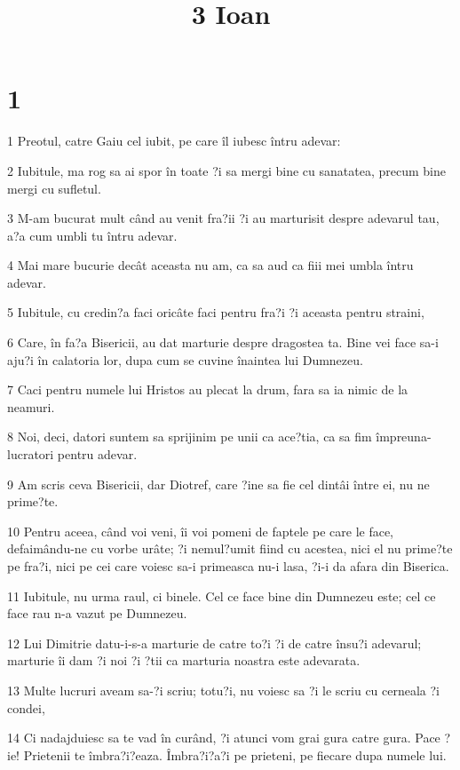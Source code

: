 

\title{3 Ioan}


\chapter{1}

\par 1 Preotul, catre Gaiu cel iubit, pe care îl iubesc întru adevar:
\par 2 Iubitule, ma rog sa ai spor în toate ?i sa mergi bine cu sanatatea, precum bine mergi cu sufletul.
\par 3 M-am bucurat mult când au venit fra?ii ?i au marturisit despre adevarul tau, a?a cum umbli tu întru adevar.
\par 4 Mai mare bucurie decât aceasta nu am, ca sa aud ca fiii mei umbla întru adevar.
\par 5 Iubitule, cu credin?a faci oricâte faci pentru fra?i ?i aceasta pentru straini,
\par 6 Care, în fa?a Bisericii, au dat marturie despre dragostea ta. Bine vei face sa-i aju?i în calatoria lor, dupa cum se cuvine înaintea lui Dumnezeu.
\par 7 Caci pentru numele lui Hristos au plecat la drum, fara sa ia nimic de la neamuri.
\par 8 Noi, deci, datori suntem sa sprijinim pe unii ca ace?tia, ca sa fim împreuna-lucratori pentru adevar.
\par 9 Am scris ceva Bisericii, dar Diotref, care ?ine sa fie cel dintâi între ei, nu ne prime?te.
\par 10 Pentru aceea, când voi veni, îi voi pomeni de faptele pe care le face, defaimându-ne cu vorbe urâte; ?i nemul?umit fiind cu acestea, nici el nu prime?te pe fra?i, nici pe cei care voiesc sa-i primeasca nu-i lasa, ?i-i da afara din Biserica.
\par 11 Iubitule, nu urma raul, ci binele. Cel ce face bine din Dumnezeu este; cel ce face rau n-a vazut pe Dumnezeu.
\par 12 Lui Dimitrie datu-i-s-a marturie de catre to?i ?i de catre însu?i adevarul; marturie îi dam ?i noi ?i ?tii ca marturia noastra este adevarata.
\par 13 Multe lucruri aveam sa-?i scriu; totu?i, nu voiesc sa ?i le scriu cu cerneala ?i condei,
\par 14 Ci nadajduiesc sa te vad în curând, ?i atunci vom grai gura catre gura. Pace ?ie! Prietenii te îmbra?i?eaza. Îmbra?i?a?i pe prieteni, pe fiecare dupa numele lui.


